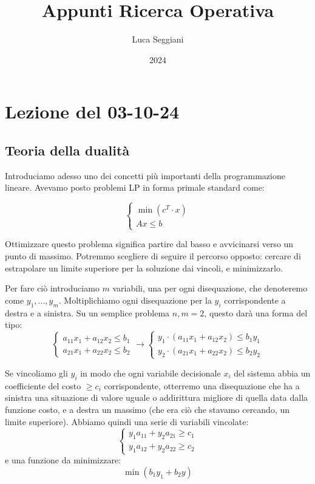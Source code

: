 \documentclass[a4paper,11pt]{article}
\title{Appunti Ricerca Operativa}
\author{Luca Seggiani}
\date{2024}
\begin{document}
\section{Lezione del 03-10-24}

\thispagestyle{empty}
\pagestyle{fancy}

\subsection{Teoria della dualità}
Introduciamo adesso uno dei concetti più importanti della programmazione lineare.
Avevamo posto problemi LP in forma primale standard come:

\[
	\begin{cases}
		\min(c^T \cdot x) \\
		Ax \leq b
	\end{cases}
\]

Ottimizzare questo problema significa partire dal basso e avvicinarsi verso un punto di massimo.
Potremmo scegliere di seguire il percorso opposto: cercare di estrapolare un limite superiore per la soluzione dai vincoli, e minimizzarlo.

Per fare ciò introduciamo $m$ variabili, una per ogni disequazione, che denoteremo come $y_1, ..., y_m$.
Moltiplichiamo ogni disequazione per la $y_i$ corrispondente a destra e a sinistra.
Su un semplice problema $n, m = 2$, questo darà una forma del tipo:
\[
	\begin{cases}
		a_{11} x_1 + a_{12} x_2 \leq b_1 \\
		a_{21} x_1 + a_{22} x_2 \leq b_2
	\end{cases}
	\rightarrow
	\begin{cases}
	y_1 \cdot \left(	a_{11} x_1 + a_{12} x_2 \right) \leq b_1 y_1 \\
	y_2 \cdot \left( a_{21} x_1 + a_{22} x_2 \right) \leq b_2 y_2
	\end{cases}
\]

Se vincoliamo gli $y_i$ in modo che ogni variabile decisionale $x_i$ del sistema abbia un coefficiente del costo $\geq c_i$ corrispondente, otterremo una disequazione che ha a sinistra una situazione di valore uguale o addirittura migliore di quella data dalla funzione costo, e a destra un massimo (che era ciò che stavamo cercando, un limite superiore).
Abbiamo quindi una serie di variabili vincolate:
\[
	\begin{cases}			
		y_1 a_11 + y_2 a_21 \geq c_1 \\ 
		y_1 a_12 + y_2 a_22 \geq c_2 
	\end{cases}
\]
e una funzione da minimizzare:
$$
\min(b_1 y_1 + b_2 y)
$$
\end{document}
